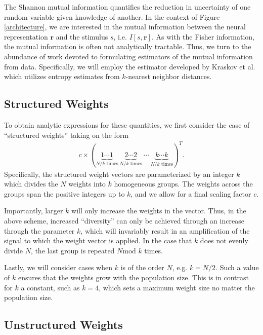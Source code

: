 \documentclass[12pt]{article}
\begin{document}
The Shannon mutual information quantifies the reduction in uncertainty of one random variable given knowledge of another. In the context of Figure \ref{architecture}, we are interested in the mutual information between the neural representation $\mathbf{r}$ and the stimulus $s$, i.e. $I[s, \mathbf{r}]$. As with the Fisher information, the mutual information is often not analytically tractable. Thus, we turn to the abundance of work devoted to formulating estimators of the mutual information from data. Specifically, we will employ the estimator developed by Kraskov et al. which utilizes entropy estimates from $k$-nearest neighbor distances.
\subsection{Structured Weights}
To obtain analytic expressions for these quantities, we first consider the case of ``structured weights'' taking on the form
\begin{align}
c \times \left(\underbrace{1 \cdots 1}_{N/k \text{ times}}  \ \underbrace{2 \cdots 2}_{N/k \text{ times}} \ \cdots \ \underbrace{k \cdots k}_{N/k \text{ times}}   \right)^T.
\end{align}
Specifically, the structured weight vectors are parameterized by an integer $k$ which divides the $N$ weights into $k$ homogeneous groups. The weights across the groups span the positive integers up to $k$, and we allow for a final scaling factor $c$. 

Importantly,  larger $k$ will only increase the weights in the vector. Thus, in the above scheme, increased ``diversity'' can only be achieved through an increase through the parameter $k$, which will invariably result in an amplification of the signal to which the weight vector is applied. In the case that $k$ does not evenly divide $N$, the last group is repeated $N\text{mod }k$ times.

Lastly, we will consider cases when $k$ is of the order $N$, e.g. $k = N/2$. Such a value of $k$ ensures that the weights grow with the population size. This is in contrast for $k$ a constant, such as $k=4$, which sets a maximum weight size no matter the population size. 
\subsection{Unstructured Weights}
\end{document}
